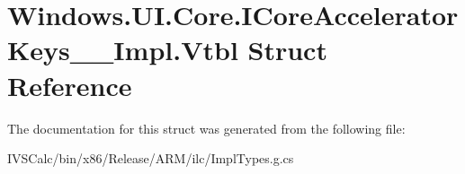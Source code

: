 \hypertarget{struct_windows_1_1_u_i_1_1_core_1_1_i_core_accelerator_keys_____impl_1_1_vtbl}{}\section{Windows.\+U\+I.\+Core.\+I\+Core\+Accelerator\+Keys\+\_\+\+\_\+\+Impl.\+Vtbl Struct Reference}
\label{struct_windows_1_1_u_i_1_1_core_1_1_i_core_accelerator_keys_____impl_1_1_vtbl}


The documentation for this struct was generated from the following file\+:\begin{DoxyCompactItemize}
\item 
I\+V\+S\+Calc/bin/x86/\+Release/\+A\+R\+M/ilc/Impl\+Types.\+g.\+cs\end{DoxyCompactItemize}
